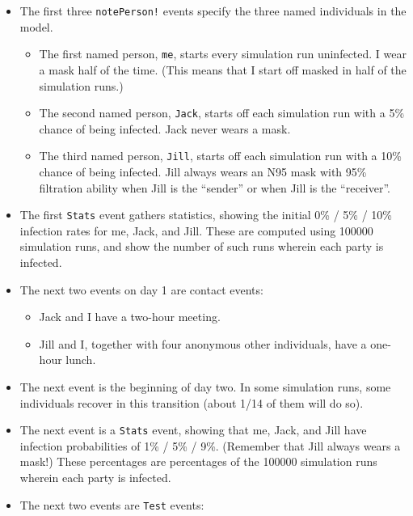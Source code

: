 \documentclass[11pt]{article}
\providecommand{\tightlist}{%
      \setlength{\itemsep}{0pt}\setlength{\parskip}{0pt}}
\begin{document}
\begin{itemize}
\item
  The first three \texttt{notePerson!} events specify the three named
  individuals in the model.

  \begin{itemize}
  \tightlist
  \item
    The first named person, \texttt{me}, starts every simulation run
    uninfected. I wear a mask half of the time. (This means that I start
    off masked in half of the simulation runs.)
  \item
    The second named person, \texttt{Jack}, starts off each simulation
    run with a 5\% chance of being infected. Jack never wears a mask.
  \item
    The third named person, \texttt{Jill}, starts off each simulation
    run with a 10\% chance of being infected. Jill always wears an N95
    mask with 95\% filtration ability when Jill is the ``sender'' or
    when Jill is the ``receiver''.
  \end{itemize}
\item
  The first \texttt{Stats} event gathers statistics, showing the initial
  0\% / 5\% / 10\% infection rates for me, Jack, and Jill. These are
  computed using 100000 simulation runs, and show the number of such
  runs wherein each party is infected.
\item
  The next two events on day 1 are contact events:

  \begin{itemize}
  \tightlist
  \item
    Jack and I have a two-hour meeting.
  \item
    Jill and I, together with four anonymous other individuals, have a
    one-hour lunch.
  \end{itemize}
\item
  The next event is the beginning of day two. In some simulation runs,
  some individuals recover in this transition (about 1/14 of them will
  do so).
\item
  The next event is a \texttt{Stats} event, showing that me, Jack, and
  Jill have infection probabilities of 1\% / 5\% / 9\%. (Remember that
  Jill always wears a mask!) These percentages are percentages of the
  100000 simulation runs wherein each party is infected.
\item
  The next two events are \texttt{Test} events:


\end{itemize}
\end{document}
